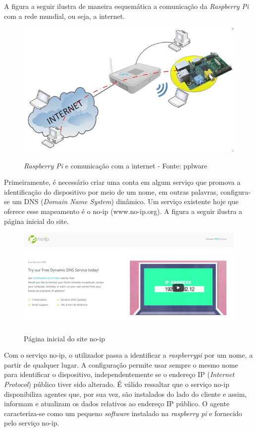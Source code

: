 A figura a seguir ilustra de maneira esquemática a comunicação da \textit{Raspberry Pi} com a rede mundial, ou seja, a internet.

\begin{figure}[H]
\centering
\includegraphics[keepaspectratio=true,scale=0.52]{figuras/raspberryeinternet.png}
\label{fig:raspberry_internet}
\caption{\textit{Raspberry Pi} e comunicação com a internet - Fonte: pplware}
\end{figure}

Primeiramente, é necessário criar uma conta em algum serviço que promova a identificação do dispositivo por meio de um nome, em outras palavras, configura-se um DNS (\textit{Domain Name System}) dinâmico. Um serviço existente hoje que oferece esse mapeamento é o no-ip (www.no-ip.org). A figura a seguir ilustra a página inicial do site.

\begin{figure}[H]
\centering
\includegraphics[keepaspectratio=true,scale=0.35]{figuras/sitenoip.png}
\label{fig:site_no_ip}
\caption{Página inicial do site no-ip}
\end{figure}

Com o serviço no-ip, o utilizador passa a identificar a \textit{raspberrypi} por um nome, a partir de qualquer lugar. A configuração permite usar sempre o mesmo nome para identificar o dispositivo, independentemente se o endereço IP (\textit{Internet Protocol}) público tiver sido alterado. É válido ressaltar que o serviço no-ip disponibiliza agentes que, por sua vez, são instalados do lado do cliente e assim, informam e atualizam os dados relativos ao endereço IP público. O agente caracteriza-se como um pequeno \textit{software} instalado na \textit{raspberry pi} e fornecido pelo serviço no-ip.

